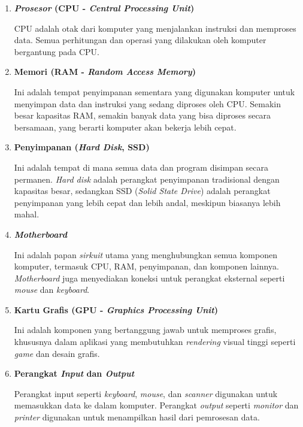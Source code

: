 \documentclass[12pt]{article}
\begin{document}
    \begin{enumerate}
        \item \textbf{\textit{Prosesor} (CPU - \textit{Central Processing Unit})}
        
        \hspace{0.61cm}CPU adalah otak dari komputer yang menjalankan instruksi dan memproses data. Semua perhitungan dan operasi yang dilakukan oleh komputer bergantung pada CPU.
        
        \item \textbf{Memori (RAM - \textit{Random Access Memory})}
        
        \hspace{0.61cm}Ini adalah tempat penyimpanan sementara yang digunakan komputer untuk menyimpan data dan instruksi yang sedang diproses oleh CPU. Semakin besar kapasitas RAM, semakin banyak data yang bisa diproses secara bersamaan, yang berarti komputer akan bekerja lebih cepat.
        
        \item \textbf{Penyimpanan (\textit{Hard Disk}, SSD)}
        
        \hspace{0.61cm}Ini adalah tempat di mana semua data dan program disimpan secara permanen. \textit{Hard disk} adalah perangkat penyimpanan tradisional dengan kapasitas besar, sedangkan SSD (\textit{Solid State Drive}) adalah perangkat penyimpanan yang lebih cepat dan lebih andal, meskipun biasanya lebih mahal.
        
        \item \textbf{\textit{Motherboard}}
        
        \hspace{0.61cm}Ini adalah papan \textit{sirkuit} utama yang menghubungkan semua komponen komputer, termasuk CPU, RAM, penyimpanan, dan komponen lainnya. \textit{Motherboard} juga menyediakan koneksi untuk perangkat eksternal seperti \textit{mouse} dan \textit{keyboard}.
        
        \item \textbf{Kartu Grafis (GPU - \textit{Graphics Processing Unit})}
        
        \hspace{0.61cm}Ini adalah komponen yang bertanggung jawab untuk memproses grafis, khususnya dalam aplikasi yang membutuhkan \textit{rendering} visual tinggi seperti \textit{game} dan desain grafis.
        
        \item \textbf{Perangkat \textit{Input} dan \textit{Output}}
        
        \hspace{0.61cm}Perangkat input seperti \textit{keyboard}, \textit{mouse}, dan \textit{scanner} digunakan untuk memasukkan data ke dalam komputer. Perangkat \textit{output} seperti \textit{monitor} dan \textit{printer} digunakan untuk menampilkan hasil dari pemrosesan data.
    \end{enumerate}
    
\end{document}
